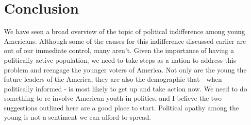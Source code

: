 \documentclass[12pt,letterpaper]{article}
\begin{document}

\section{Conclusion} %
\label{sec:Conclusion}
We have seen a broad overview of the topic of political indifference
among young Americans. Although some of the causes for this
indifference discussed earlier are out of our immediate control, many
aren't. Given the importance of having a politically active
population, we need to take steps as a nation to address this problem
and reengage the younger voters of America.  Not only are the young
the future leaders of the America, they are also the demographic that
- when politically informed - is most likely to get up and take action
now. We need to do something to re-involve American youth in politics,
and I believe the two suggestions outlined here are a good place to
start.  Political apathy among the young is not a sentiment we can
afford to spread.

\end{document}
